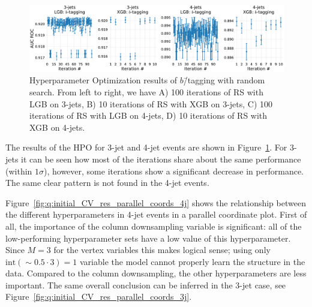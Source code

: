 \begin{figure}%
  \centerfloat
  \includegraphics[width=\textwidth, trim=0 0 0 0, clip]{figures/quarks/cv_res_lgb-btag-down_sample=1.00-ML_vars=vertex-selection=b-ejet_min=4-n_iter_RS_lgb=99-n_iter_RS_xgb=9-cdot_cut=0.90-version=19.pdf}
  \vspace{3mm}
  \caption[Hyperparameter Optimization of $b$\=/Tagging]{
    Hyperparameter Optimization results of $b$\=/tagging with random search. From left to right, we have A) \num{100} iterations of RS with LGB on 3-jets, B) \num{10} iterations of RS with XGB on 3-jets, C) \num{100} iterations of RS with LGB on 4-jets, D) \num{10} iterations of RS with XGB on 4-jets. }
  \label{fig:q:CV_res_iterations_b_tagging}%
\end{figure}
\vspace{-3mm}

The results of the HPO for 3-jet and 4-jet events are shown in Figure~\ref{fig:q:CV_res_iterations_b_tagging}. For 3-jets it can be seen how most of the iterations share about the same performance (within $1\sigma$), however, some iterations show a significant decrease in performance. The same clear pattern is not found in the 4-jet events.

Figure~\ref{fig:q:initial_CV_res_parallel_coords_4j} shows the relationship between the different hyperparameters in 4-jet events in a parallel coordinate plot. First of all, the importance of the column downsampling  variable is significant: all of the low-performing hyperparameter sets have a low value of this hyperparameter. Since $M=3$ for the vertex variables this makes logical sense; using only $\mathrm{int}({\sim} 0.5 \cdot 3) = 1$ variable the model cannot properly learn the structure in the data. Compared to the column downsampling, the other hyperparameters are less important. The same overall conclusion can be inferred in the 3-jet case, see Figure~\ref{fig:q:initial_CV_res_parallel_coords_3j}.

